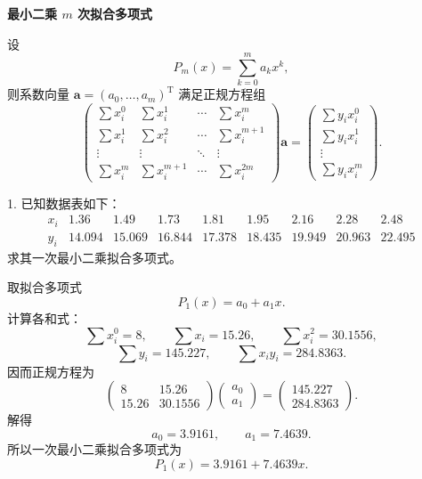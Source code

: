 \documentclass[11pt, a4paper]{ctexart}
\begin{document}
\begin{center}
    \textbf{最小二乘 $m$ 次拟合多项式}
\end{center}

设
\[
    P_m(x)=\sum_{k=0}^{m}a_kx^k,
\]
则系数向量 $\bm a=(a_0,\ldots,a_m)^{\mathrm T}$ 满足正规方程组
\[
    \begin{pmatrix}
        \sum x_i^0 & \sum x_i^1 & \cdots & \sum x_i^m \\
        \sum x_i^1 & \sum x_i^2 & \cdots & \sum x_i^{m+1} \\
        \vdots & \vdots & \ddots & \vdots \\
        \sum x_i^m & \sum x_i^{m+1} & \cdots & \sum x_i^{2m}
    \end{pmatrix}
    \bm a
    =
    \begin{pmatrix}
        \sum y_ix_i^0 \\
        \sum y_ix_i^1 \\
        \vdots \\
        \sum y_ix_i^m
    \end{pmatrix}.
\]

\begin{problem}{1. 已知数据表如下：}
    \[
        \begin{array}{c|cccccccc}
            x_i & 1.36 & 1.49 & 1.73 & 1.81 & 1.95 & 2.16 & 2.28 & 2.48 \\ \hline
            y_i & 14.094 & 15.069 & 16.844 & 17.378 & 18.435 & 19.949 & 20.963 & 22.495
        \end{array}
    \]
    求其一次最小二乘拟合多项式。
\end{problem}

\begin{solution}
    取拟合多项式
    \[
        P_1(x)=a_0+a_1x.
    \]
    计算各和式：
    \[
        \sum x_i^0=8,\qquad \sum x_i=15.26,\qquad \sum x_i^2=30.1556,
    \]
    \[
        \sum y_i=145.227,\qquad \sum x_iy_i=284.8363.
    \]
    因而正规方程为
    \[
        \begin{pmatrix}
            8 & 15.26 \\
            15.26 & 30.1556
        \end{pmatrix}
        \begin{pmatrix}
            a_0 \\
            a_1
        \end{pmatrix}
        =
        \begin{pmatrix}
            145.227 \\
            284.8363
        \end{pmatrix}.
    \]
    解得
    \[
        a_0=3.9161,\qquad a_1=7.4639.
    \]
    所以一次最小二乘拟合多项式为
    \[
        P_1(x)=3.9161+7.4639x.
    \]
\end{solution}
\end{document}
